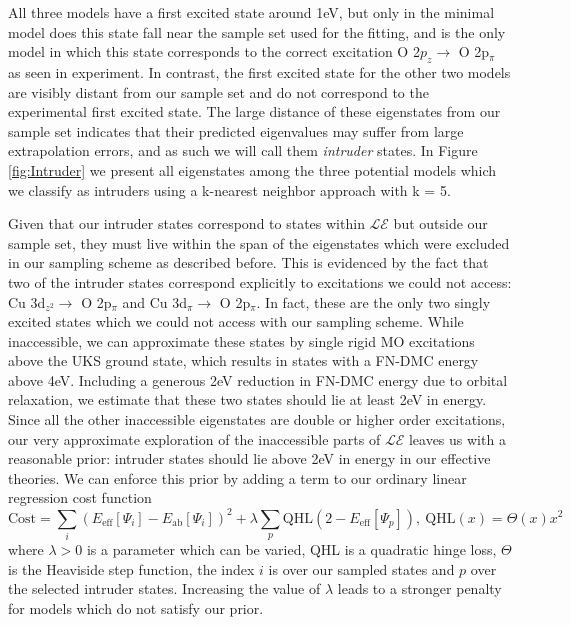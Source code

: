 \documentclass[12pt]{article}
\begin{document}
All three models have a first excited state around 1eV, but only in the minimal model does this state fall near the sample set used for the fitting, and is the only model in which this state corresponds to the correct excitation O 2$p_z \rightarrow $ O 2p$_\pi$ as seen in experiment.
In contrast, the first excited state for the other two models are visibly distant from our sample set and do not correspond to the experimental first excited state.
The large distance of these eigenstates from our sample set indicates that their predicted eigenvalues may suffer from large extrapolation errors, and as such we will call them \textit{intruder} states.
In Figure \ref{fig:Intruder} we present all eigenstates among the three potential models which we classify as intruders using a k-nearest neighbor approach with k = 5.

Given that our intruder states correspond to states within $\mathcal{LE}$ but outside our sample set, they must live within the span of the eigenstates which were excluded in our sampling scheme as described before.
This is evidenced by the fact that two of the intruder states correspond explicitly to excitations we could not access: Cu 3d$_{z^2} \rightarrow $ O 2p$_\pi$ and  Cu 3d$_\pi \rightarrow $ O 2p$_\pi$.
In fact, these are the only two singly excited states which we could not access with our sampling scheme.
While inaccessible, we can approximate these states by single rigid MO excitations above the UKS ground state, which results in states with a FN-DMC energy above 4eV.
Including a generous 2eV reduction in FN-DMC energy due to orbital relaxation, we estimate that these two states should lie at least 2eV in energy. 
Since all the other inaccessible eigenstates are double or higher order excitations, our very approximate exploration of the inaccessible parts of $\mathcal{LE}$ leaves us with a reasonable prior: intruder states should lie above 2eV in energy in our effective theories.
We can enforce this prior by adding a term to our ordinary linear regression cost function
\begin{equation}
\text{Cost} = \sum_{i} (E_\text{eff}[\Psi_i] - E_\text{ab}[\Psi_i])^2 + \lambda \sum_{p}\text{QHL}(2 - E_\text{eff}[\Psi_p]),\ \text{QHL}(x) = \Theta(x)x^2
\label{eq:cost}
\end{equation}
where $\lambda>0$ is a parameter which can be varied, QHL is a quadratic hinge loss, $\Theta$ is the Heaviside step function, the index $i$ is over our sampled states and $p$ over the selected intruder states.
Increasing the value of $\lambda$ leads to a stronger penalty for models which do not satisfy our prior.
\end{document}
